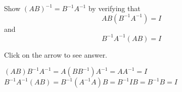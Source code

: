 \documentclass{ximera}
\begin{document}
\begin{problem}\label{prb:4.50}Show $\left( AB\right) ^{-1}=B^{-1}A^{-1}$ by verifying that
\begin{equation*}
AB\left(
B^{-1}A^{-1}\right) =I
\end{equation*} and
\begin{equation*}
B^{-1}A^{-1}\left( AB\right) =I
\end{equation*}

Click on the arrow to see answer.
\begin{expandable}
$\left( AB\right)
B^{-1}A^{-1}=A\left( BB^{-1}\right) A^{-1}=AA^{-1}=I$ $B^{-1}A^{-1}\left(
AB\right) =B^{-1}\left( A^{-1}A\right) B=B^{-1}IB=B^{-1}B=I$
\end{expandable}
\end{problem}
\end{document}
